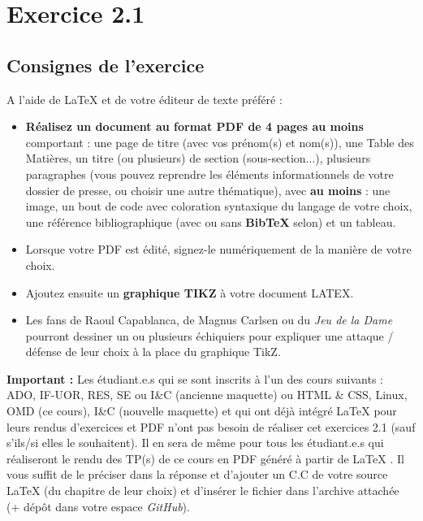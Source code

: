 \section{Exercice 2.1}
\subsection{Consignes de l'exercice}
\begin{tcb-instructions}[title=Exercice 2.1]
A l’aide de \LaTeX{ }et de votre éditeur de texte préféré :

    \begin{itemize}[label=\checkmark]
        \item \textbf{Réalisez un document au format PDF de 4 pages au moins} comportant : une page de titre (avec vos prénom(s) et nom(s)), une Table des Matières, un titre (ou plusieurs) de section (sous-section...), plusieurs paragraphes (vous pouvez reprendre les éléments informationnels de votre dossier de presse, ou choisir une autre thématique), avec \textbf{au moins} : une image, un bout de code avec coloration syntaxique du langage de votre choix, une référence bibliographique (avec ou sans \textbf{BibTeX} selon) et un tableau.
        \item Lorsque votre PDF est édité, signez-le numériquement de la manière de votre choix.
        \item Ajoutez ensuite un \textbf{graphique TIKZ} à votre document LATEX.
        \item Les fans de Raoul Capablanca, de Magnus Carlsen ou du \textit{Jeu de la Dame} pourront dessiner un ou plusieurs échiquiers pour expliquer une attaque / défense de leur choix à la place du graphique TikZ.
    \end{itemize}

\textbf{Important :} Les étudiant.e.s qui se sont inscrits à l’un des cours suivants : ADO, IF-UOR, RES, SE ou I\&C (ancienne maquette) ou HTML \& CSS, Linux, OMD (ce cours), I\&C (nouvelle maquette) et qui ont déjà intégré \LaTeX{ }pour leurs rendus d’exercices et PDF n’ont pas besoin de réaliser cet exercices 2.1 (sauf s’ils/si elles le souhaitent). Il en sera de même pour tous les étudiant.e.s qui réaliseront le rendu des TP(s) de ce cours en PDF généré à partir de \LaTeX{ }. Il vous suffit de le préciser dans la réponse et d’ajouter un C.C de votre source \LaTeX{ }(du chapitre de leur choix) et d’insérer le fichier  dans l’archive attachée (+ dépôt dans votre espace \textit{GitHub}).

\end{tcb-instructions}

